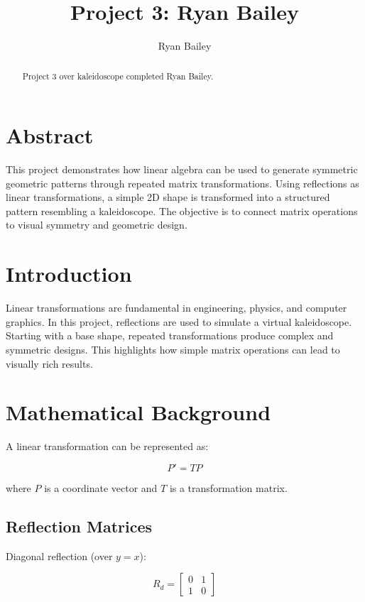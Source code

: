 \documentclass{ximera}
\title{Project 3: Ryan Bailey}
\author{Ryan Bailey}
\begin{document}
\begin{abstract}
    Project 3 over kaleidoscope completed Ryan Bailey. 
\end{abstract}
\maketitle

\section*{Abstract}

This project demonstrates how linear algebra can be used to generate symmetric geometric patterns through repeated matrix transformations. Using reflections as linear transformations, a simple 2D shape is transformed into a structured pattern resembling a kaleidoscope. The objective is to connect matrix operations to visual symmetry and geometric design.

\section*{Introduction}

Linear transformations are fundamental in engineering, physics, and computer graphics. In this project, reflections are used to simulate a virtual kaleidoscope. Starting with a base shape, repeated transformations produce complex and symmetric designs. This highlights how simple matrix operations can lead to visually rich results.

\section*{Mathematical Background}

A linear transformation can be represented as:

\[
P' = TP
\]

where $P$ is a coordinate vector and $T$ is a transformation matrix.

\subsection*{Reflection Matrices}

Diagonal reflection (over $y=x$):

\[
R_d =
\begin{bmatrix}
0 & 1 \\
1 & 0
\end{bmatrix}
\]
\end{document}
